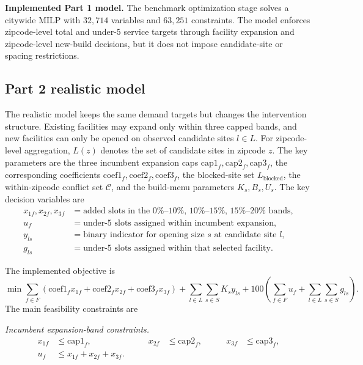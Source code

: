 \documentclass[11pt]{article}
\begin{document}
\begin{resultbox}
\textbf{Implemented Part 1 model.}
The benchmark optimization stage solves a citywide MILP with \(32{,}714\) variables and \(63{,}251\) constraints. The model enforces zipcode-level total and under-\(5\) service targets through facility expansion and zipcode-level new-build decisions, but it does not impose candidate-site or spacing restrictions.
\end{resultbox}

\subsection{Part 2 realistic model}

The realistic model keeps the same demand targets but changes the intervention structure. Existing facilities may expand only within three capped bands, and new facilities can only be opened on observed candidate sites \(l \in L\). For zipcode-level aggregation, \(L(z)\) denotes the set of candidate sites in zipcode \(z\). The key parameters are the three incumbent expansion caps \(\mathrm{cap1}_f,\mathrm{cap2}_f,\mathrm{cap3}_f\), the corresponding coefficients \(\mathrm{coef1}_f,\mathrm{coef2}_f,\mathrm{coef3}_f\), the blocked-site set \(L_{\text{blocked}}\), the within-zipcode conflict set \(\mathcal{C}\), and the build-menu parameters \(K_s,B_s,U_s\). The key decision variables are
\[
\begin{aligned}
x_{1f},x_{2f},x_{3f} &= \text{added slots in the }0\%\text{--}10\%,\,10\%\text{--}15\%,\,15\%\text{--}20\%\text{ bands},\\
u_f &= \text{under-\(5\) slots assigned within incumbent expansion},\\
y_{ls} &= \text{binary indicator for opening size } s \text{ at candidate site } l,\\
g_{ls} &= \text{under-\(5\) slots assigned within that selected facility.}
\end{aligned}
\]

The implemented objective is
\[
\min \sum_{f \in F}\left(\mathrm{coef1}_f x_{1f}+\mathrm{coef2}_f x_{2f}+\mathrm{coef3}_f x_{3f}\right)
 + \sum_{l \in L}\sum_{s \in S} K_s y_{ls}
 + 100\left(\sum_{f \in F}u_f+\sum_{l \in L}\sum_{s \in S}g_{ls}\right).
\]
The main feasibility constraints are

\noindent\textit{Incumbent expansion-band constraints.}
\[
\begin{alignedat}{3}
x_{1f} &\le \mathrm{cap1}_f, &\qquad
x_{2f} &\le \mathrm{cap2}_f, &\qquad
x_{3f} &\le \mathrm{cap3}_f,\\
u_f &\le x_{1f}+x_{2f}+x_{3f}.
\end{alignedat}
\]
\end{document}
